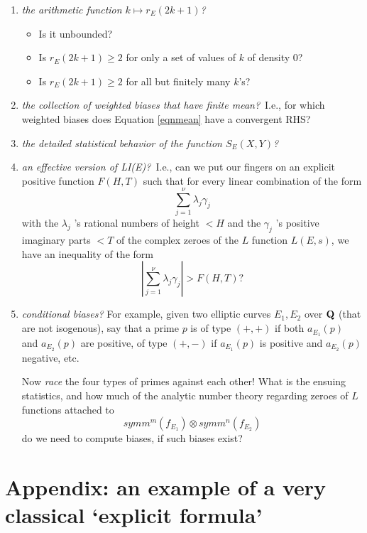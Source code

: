 \documentclass[11pt]{article}
\theoremstyle{plain}
\theoremstyle{definition}
\numberwithin{equation}{section}
\numberwithin{figure}{section}
\numberwithin{table}{section}
\def\Q{\bf{Q}}
\begin{document}
 \begin{enumerate}\item  {\it the arithmetic function  $k \mapsto r_E(2k+1)$?}
 \begin{itemize} \item Is it unbounded?
 \item Is $r_E(2k+1)\ge 2$ for  only a set of values of $k$ of density $0$?
 \item  Is  $r_E(2k+1)\ge 2$ for all but finitely many $k$'s?  \end{itemize} \vskip20pt
 \item {\it  the collection of weighted biases that have finite mean?}\  I.e., for which weighted biases does Equation \ref{eqnmean} have a convergent RHS?

 \vskip20pt \item {\it the detailed statistical behavior of the function $S_E(X,Y)$?}

  \vskip20pt \item {\it an effective version of LI(E)?}\  I.e., can we put our fingers on an explicit  positive function $F(H,T)$ such that for every linear combination of the form $$\sum_{j=1}^{\nu} \lambda_j\gamma_j$$ with the $\lambda_j$ 's rational numbers of height $< H$ and the  $\gamma_j$ 's  positive imaginary parts $<T$ of the complex zeroes of the $L$ function $L(E,s)$, we have  an inequality of the form $$|\sum_{j=1}^{\nu} \lambda_j\gamma_j|  > F(H, T)?$$

   \vskip20pt \item {\it conditional biases?}  For example, given two elliptic curves $E_1, E_2$ over ${\Q}$ (that are not isogenous), say that a prime $p$ is of type $(+,+)$ if both $a_{E_1}(p)$ and $a_{E_2}(p)$ are positive, of type  $(+,-)$ if  $a_{E_1}(p)$ is  positive and $a_{E_2}(p)$ negative, etc.

 Now  {\it race} the four types of primes against each other!  What is the ensuing statistics, and how much of the analytic number theory regarding zeroes of $L$ functions attached to  $$symm^m(f_{E_1})\otimes symm^n(f_{E_2})$$  do we need to compute biases, if  such biases exist? \end{enumerate}
\vskip10pt
\section{Appendix: an example of a very classical `explicit formula'}
\end{document}
